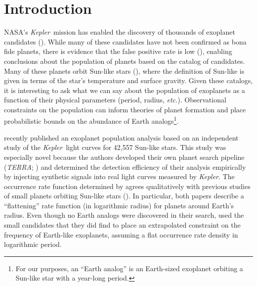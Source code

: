 \documentclass[12pt,preprint]{aastex}
\newcommand{\project}[1]{\emph{#1}}
\newcommand{\kepler}{\project{Kepler}}
\newcommand{\terra}{\project{TERRA}}
\newcommand{\foreign}[1]{\emph{#1}}
\newcommand{\etc}{\foreign{etc.}}
\newcommand{\sectlabel}[1]{\label{sect:#1}}
\begin{document}

\section{Introduction}
\sectlabel{intro}

NASA's \kepler\ mission has enabled the discovery of thousands of exoplanet
candidates (\citealt{kepler-catalog}).
While many of these candidates have not been confirmed as bona fide planets,
there is evidence that the false positive rate is low (\citealt{morton,
fressin-fp}), enabling conclusions about the population of planets based on
the catalog of candidates.
Many of these planets orbit Sun-like stars (\citealt{petigura}), where the
definition of Sun-like is given in terms of the star's temperature and surface
gravity.
Given these catalogs, it is interesting to ask what we can say about the
population of exoplanets as a function of their physical parameters
(period, radius, \etc).
Observational constraints on the population can inform theories of planet
formation and place probabilistic bounds on the abundance of Earth
analogs\footnote{For our purposes, an ``Earth analog'' is an Earth-sized
exoplanet orbiting a Sun-like star with a year-long period.}.

\citet{petigura} recently published an exoplanet population analysis based on
an independent study of the \kepler\ light curves for 42,557 Sun-like stars.
This study was especially novel because the authors developed their own
planet search pipeline (\terra; \citealt{petigura-a}) and determined the
detection efficiency of their analysis empirically by injecting synthetic
signals into real light curves measured by \kepler.
The occurrence rate function determined by \citet{petigura} agrees
qualitatively with previous studies of small planets orbiting Sun-like stars
(\citealt{dong}).
In particular, both papers describe a ``flattening'' rate function (in
logarithmic radius) for planets around Earth's radius.
Even though no Earth analogs were discovered in their search, \citet{petigura}
used the small candidates that they did find to place an extrapolated
constraint on the frequency of Earth-like exoplanets, assuming a flat
occurrence rate density in logarithmic period.
\end{document}
